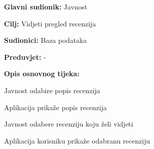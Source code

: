 				
				\noindent {}
				\begin{packed_item}
	
						\item \textbf{Glavni sudionik: }Javnost
						\item  \textbf{Cilj:} Vidjeti pregled recenzija
						\item  \textbf{Sudionici:} Baza podataka
						\item  \textbf{Preduvjet:} -
						\item  \textbf{Opis osnovnog tijeka:}
						
						\item[] \begin{packed_enum}
	
							\item Javnost odabire popis recenzija
							\item Aplikacija prikaže popis recenzija
							\item Javnost odabere recenziju koju želi vidjeti
							\item Aplikacija korisniku prikaže odabranu recenziju
						\end{packed_enum}
				\end{packed_item}

